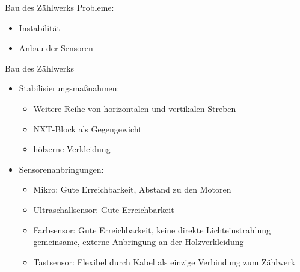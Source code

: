 \documentclass{beamer}
\begin{document}
\begin{frame}{Bau des Zählwerks}
Probleme:
\begin{itemize}
	\item Instabilität
	\item Anbau der Sensoren
\end{itemize}
\end{frame}

\begin{frame}{Bau des Zählwerks}
\begin{itemize}
	\item Stabilisierungsmaßnahmen:
	\begin{itemize}
		\item Weitere Reihe von horizontalen und vertikalen Streben
		\item NXT-Block als Gegengewicht
		\item hölzerne Verkleidung
	\end{itemize}
	\item<2> Sensorenanbringungen:
	\begin{itemize}
		\item Mikro: Gute Erreichbarkeit, Abstand zu den Motoren
		\item Ultraschallsensor: Gute Erreichbarkeit
		\item Farbsensor: Gute Erreichbarkeit, keine direkte Lichteinstrahlung\\ 
		\Rightarrow gemeinsame, externe Anbringung an der Holzverkleidung
		\item Tastsensor: Flexibel durch Kabel als einzige Verbindung zum Zählwerk
	\end{itemize}
\end{itemize}
\end{frame}
\end{document}
